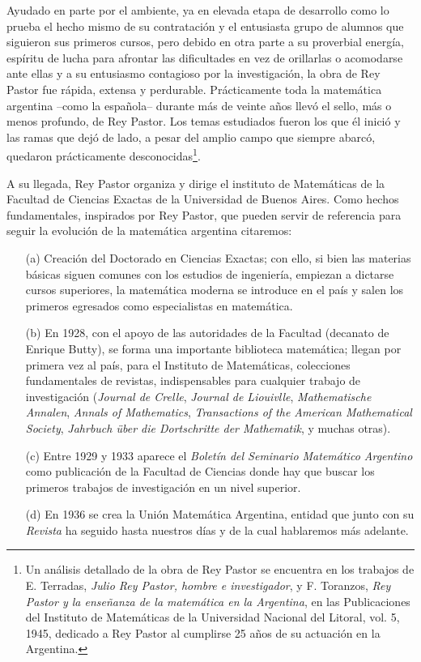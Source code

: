 Ayudado en parte por el ambiente, ya en elevada etapa de desarrollo como lo
prueba el hecho mismo de su contratación y el entusiasta grupo de alumnos que
siguieron sus primeros cursos, pero debido en otra parte a su proverbial
energía, espíritu de lucha para afrontar las dificultades en vez de orillarlas
o acomodarse ante ellas y a su entusiasmo contagioso por la investigación, la
obra de Rey Pastor fue rápida, extensa y perdurable. Prácticamente toda la
matemática argentina --como la española-- durante más de veinte años llevó el
sello, más o menos profundo, de Rey Pastor. Los temas estudiados fueron los
que él inició y las ramas que dejó de lado, a pesar del amplio campo que
siempre abarcó, quedaron prácticamente desconocidas\footnote{Un análisis
	detallado de la obra de Rey Pastor se encuentra en los trabajos de E.
	Terradas, \emph{Julio Rey Pastor, hombre e investigador}, y F. Toranzos,
	\emph{Rey Pastor y la enseñanza de la matemática en la Argentina}, en las
Publicaciones del Instituto de Matemáticas de la Universidad Nacional del
Litoral, vol. 5, 1945, dedicado a Rey Pastor al cumplirse 25 años de su
actuación en la Argentina.}.

A su llegada, Rey Pastor organiza y dirige el instituto de Matemáticas de la
Facultad de Ciencias Exactas de la Universidad de Buenos Aires. Como hechos
fundamentales, inspirados por Rey Pastor, que pueden servir de referencia para
seguir la evolución de la matemática argentina citaremos: 
\begin{enumerate}
	\item[(a)] Creación del Doctorado en Ciencias Exactas; con ello, si bien las
		materias básicas siguen comunes con los estudios de ingeniería,
		empiezan a dictarse cursos superiores, la matemática moderna se
		introduce en el país y salen los primeros egresados como especialistas
		en matemática.
	\item[(b)] En 1928, con el apoyo de las autoridades de la Facultad
		(decanato de Enrique Butty), se forma una importante biblioteca
		matemática; llegan por primera vez al país, para el Instituto de
		Matemáticas, colecciones fundamentales de revistas, indispensables para
		cualquier trabajo de investigación (\emph{Journal de Crelle},
		\emph{Journal de Liouivlle}, \emph{Mathematische Annalen}, \emph{Annals
		of Mathematics}, \emph{Transactions of the American Mathematical
		Society}, \emph{Jahrbuch \"uber die Dortschritte der Mathematik}, y
		muchas otras). 
	\item [(c)] Entre 1929 y 1933 aparece el \emph{Boletín del Seminario
		Matemático Argentino} como publicación de la Facultad de Ciencias donde
		hay que buscar los primeros trabajos de investigación en un nivel
		superior. 
	\item [(d)] En 1936 se crea la Unión Matemática Argentina, entidad que
		junto con su \emph{Revista} ha seguido hasta nuestros días y de la cual
		hablaremos más adelante.
\end{enumerate}

